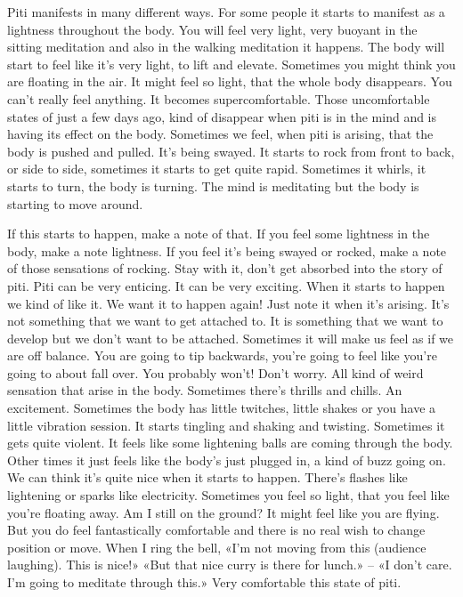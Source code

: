 \documentclass[letterpaper,10pt,english]{sphinxmanual}
\begin{document}
\sphinxAtStartPar
Piti manifests in many different ways. For some people it starts to manifest as a lightness throughout the body. You will feel very light, very buoyant in the sitting meditation and also in the walking meditation it happens.
The body will start to feel like it’s very light, to lift and elevate. Sometimes
you  might  think  you  are  floating  in  the  air.  It  might  feel  so  light,  that  the
whole  body  disappears. You  can’t  really  feel  anything.  It  becomes  supercomfortable.  Those  uncomfortable  states  of  just  a  few  days  ago,  kind  of
disappear when piti is in the mind and is having its effect on the body. Sometimes we feel, when piti is arising, that the body is pushed and pulled. It’s
being swayed. It starts to rock from front to back, or side to side, sometimes
it starts to get quite rapid. Sometimes it whirls, it starts to turn, the body is
turning. The mind is meditating but the body is starting to move around.

\sphinxAtStartPar
If this starts to happen, make a note of that. If you feel some lightness
in the body, make a note lightness. If you feel it’s being swayed or rocked,
  make a note of those sensations of rocking. Stay with it, don’t get absorbed
into the story of piti. Piti can be very enticing. It can be very exciting. When
it starts to happen we kind of like it. We want it to happen again! Just note
it when it’s arising. It’s not something that we want to get attached to. It is
something that we want to develop but we don’t want to be attached. Sometimes it will make us feel as if we are off balance. You are going to tip backwards, you’re going to feel like you’re going to about fall over. You probably
won’t! Don’t worry. All kind of weird sensation that arise in the body. Sometimes there’s thrills and chills. An excitement. Sometimes the body has little
twitches, little shakes or you have a little vibration session. It starts tingling
and shaking and twisting. Sometimes it gets quite violent. It feels like some
lightening balls are coming through the body. Other times it just feels like
the body’s just plugged in, a kind of buzz going on. We can think it’s quite
nice when it starts to happen. There’s flashes like lightening or sparks like
electricity.  Sometimes  you  feel  so  light,  that  you  feel  like  you’re  floating
away. Am I still on the ground? It might feel like you are flying. But you do
feel fantastically comfortable and there is no real wish to change position or
move. When I ring the bell, «I’m not moving from this (audience laughing).
This is nice!» «But that nice curry is there for lunch.» – «I don’t care. I’m
going to meditate through this.» Very comfortable this state of piti.
\end{document}
